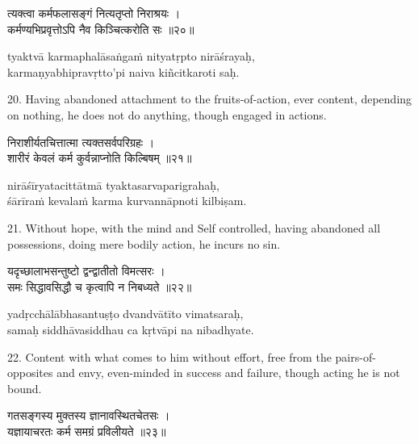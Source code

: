 \begin{gitaverse}
त्यक्त्वा कर्मफलासङ्गं नित्यतृप्तो निराश्रयः । \\
कर्मण्यभिप्रवृत्तोऽपि नैव किञ्चित्करोति सः ॥२०॥
\end{gitaverse}

\begin{transliteration}
tyaktvā karmaphalāsaṅgaṁ nityatṛpto nirāśrayaḥ, \\
karmaṇyabhipravṛtto'pi naiva kiñcitkaroti saḥ.
\end{transliteration}

20. Having abandoned attachment to the fruits-of-action, ever content,
depending on nothing, he does not do anything, though engaged in actions.

\begin{gitaverse}
निराशीर्यतचित्तात्मा त्यक्तसर्वपरिग्रहः । \\
शारीरं केवलं कर्म कुर्वन्नाप्नोति किल्बिषम् ॥२१॥
\end{gitaverse}

\begin{transliteration}
nirāśīryatacittātmā tyaktasarvaparigrahaḥ, \\
śārīraṁ kevalaṁ karma kurvannāpnoti kilbiṣam.
\end{transliteration}

21. Without hope, with the mind and Self controlled, having abandoned all
possessions, doing mere bodily action, he incurs no sin.

\begin{gitaverse}
यदृच्छालाभसन्तुष्टो द्वन्द्वातीतो विमत्सरः । \\
समः सिद्धावसिद्धौ च कृत्वापि न निबध्यते ॥२२॥
\end{gitaverse}

\begin{transliteration}
yadṛcchālābhasantuṣṭo dvandvātīto vimatsaraḥ, \\
samaḥ siddhāvasiddhau ca kṛtvāpi na nibadhyate.
\end{transliteration}

22. Content with what comes to him without effort, free from the
pairs-of-opposites and envy, even-minded in success and failure, though acting
he is not bound.

\begin{gitaverse}
गतसङ्गस्य मुक्तस्य ज्ञानावस्थितचेतसः । \\
यज्ञायाचरतः कर्म समग्रं प्रविलीयते ॥२३॥
\end{gitaverse}

